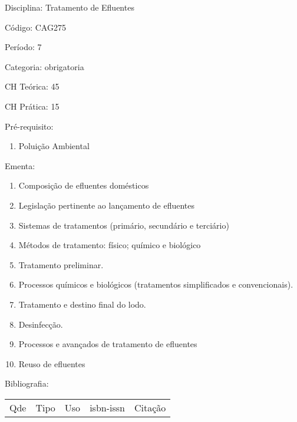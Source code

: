 \documentclass[12pt,a4paper,twoside]{report}
\begin{document}
Disciplina: Tratamento de Efluentes

Código: CAG275

Período: 7

Categoria: obrigatoria

CH Teórica: 45

CH Prática: 15




Pré-requisito:
\begin{enumerate}
\item Poluição Ambiental
\end{enumerate}

Ementa:
\begin{enumerate}
\item Composição de efluentes domésticos
\item Legislação pertinente ao lançamento de efluentes
\item Sistemas de tratamentos (primário, secundário e terciário)
\item Métodos de tratamento: físico; químico e biológico
\item Tratamento preliminar.
\item Processos químicos e biológicos (tratamentos simplificados e convencionais).
\item Tratamento e destino final do lodo.
\item Desinfecção.
\item Processos e avançados de tratamento de efluentes
\item Reuso de efluentes
\end{enumerate}



Bibliografia:


\begin{tabular}{llllp{8cm}}
Qde & Tipo & Uso & isbn-issn & Citação \\
\end{tabular}
\end{document}
